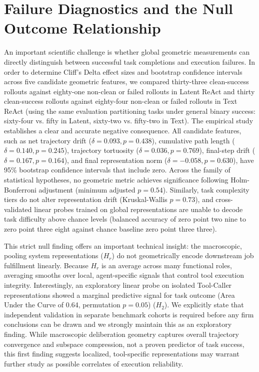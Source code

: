 \documentclass[a4paper, 12pt]{report}
\begin{document}
\section{Failure Diagnostics and the Null Outcome Relationship}
An important scientific challenge is whether global geometric measurements can directly distinguish between successful task completions and execution failures. In order to determine Cliff's Delta effect sizes and bootstrap confidence intervals across five candidate geometric features, we compared thirty-three clean-success rollouts against eighty-one non-clean or failed rollouts in Latent ReAct and thirty clean-success rollouts against eighty-four non-clean or failed rollouts in Text ReAct (using the same evaluation partitioning tasks under general binary success: sixty-four vs. fifty in Latent, sixty-two vs. fifty-two in Text).
The empirical study establishes a clear and accurate negative consequence. All candidate features, such as net trajectory drift ($\delta = 0.093, p = 0.438$), cumulative path length ($\delta = 0.140, p = 0.245$), trajectory tortuosity ($\delta = 0.036, p = 0.769$), final-step drift ($\delta = 0.167, p = 0.164$), and final representation norm ($\delta = -0.058, p = 0.630$), have 95\% bootstrap confidence intervals that include zero. Across the family of statistical hypotheses, no geometric metric achieves significance following Holm-Bonferroni adjustment (minimum adjusted $p = 0.54$). Similarly, task complexity tiers do not alter representation drift (Kruskal-Wallis $p = 0.73$), and cross-validated linear probes trained on global representations are unable to decode task difficulty above chance levels (balanced accuracy of zero point two nine to zero point three eight against chance baseline zero point three three).

This strict null finding offers an important technical insight: the macroscopic, pooling system representations ($H_r$) do not geometrically encode downstream job fulfillment linearly. Because $H_r$ is an average across many functional roles, averaging smooths over local, agent-specific signals that control tool execution integrity. Interestingly, an exploratory linear probe on isolated Tool-Caller representations showed a marginal predictive signal for task outcome (Area Under the Curve of 0.64, permutation $p = 0.05$) ($H_2$). We explicitly state that independent validation in separate benchmark cohorts is required before any firm conclusions can be drawn and we strongly maintain this as an exploratory finding. While macroscopic deliberation geometry captures overall trajectory convergence and subspace compression, not a proven predictor of task success, this first finding suggests localized, tool-specific representations may warrant further study as possible correlates of execution reliability.
\end{document}
